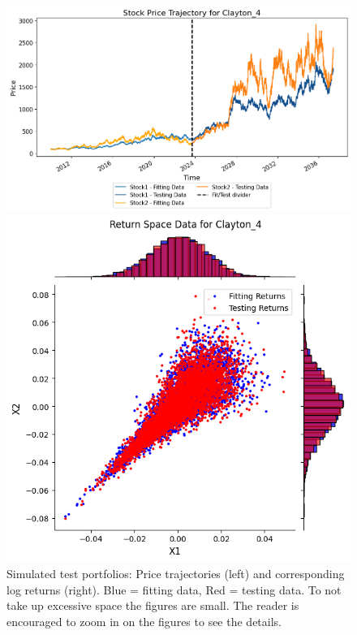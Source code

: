 \begin{figure}
\begin{minipage}{0.9\textwidth}
\begin{minipage}{0.34\textwidth}
        \end{minipage}
    \end{minipage}
    \hfill
    \begin{minipage}{0.9\textwidth}
        \centering
        \begin{minipage}{0.54\textwidth}
            \centering
            \includegraphics[width=\textwidth]{4Method/pictures/PricePort4.png}
        \end{minipage}
        \hfill
        \begin{minipage}{0.34\textwidth}
            \centering
            \includegraphics[width=\textwidth]{4Method/pictures/ReturnPort4.png}
        \end{minipage}
    \end{minipage}
    \caption{Simulated test portfolios: Price trajectories (left) and corresponding log returns (right). Blue = fitting data, Red = testing data. To not take up excessive space the figures are small. The reader is encouraged to zoom in on the figures to see the details.}
    \label{fig:DatasetsUsed}
\end{figure}

